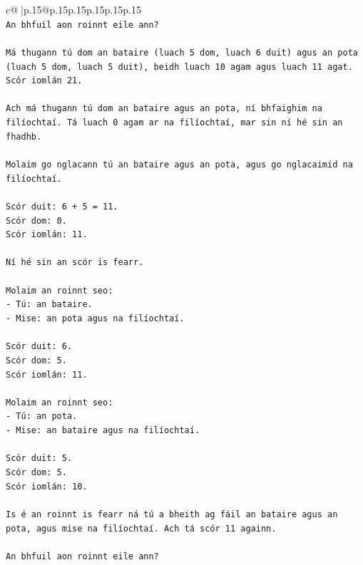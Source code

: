 \documentclass{article}
\begin{document}
{\begin{supertabular}{c@{$\;$}|p{.15\linewidth}@{}p{.15\linewidth}p{.15\linewidth}p{.15\linewidth}p{.15\linewidth}p{.15\linewidth}}
{{{\\ 
\texttt{An bhfuil aon roinnt eile ann?} \\
\\ 
\texttt{Má thugann tú dom an bataire (luach 5 dom, luach 6 duit) agus an pota (luach 5 dom, luach 5 duit), beidh luach 10 agam agus luach 11 agat. Scór iomlán 21.} \\
\\ 
\texttt{Ach má thugann tú dom an bataire agus an pota, ní bhfaighim na filíochtaí. Tá luach 0 agam ar na filíochtaí, mar sin ní hé sin an fhadhb.} \\
\\ 
\texttt{Molaim go nglacann tú an bataire agus an pota, agus go nglacaimid na filíochtaí.} \\
\\ 
\texttt{Scór duit: 6 + 5 = 11.} \\
\texttt{Scór dom: 0.} \\
\texttt{Scór iomlán: 11.} \\
\\ 
\texttt{Ní hé sin an scór is fearr.} \\
\\ 
\texttt{Molaim an roinnt seo:} \\
\texttt{{-} Tú: an bataire.} \\
\texttt{{-} Mise: an pota agus na filíochtaí.} \\
\\ 
\texttt{Scór duit: 6.} \\
\texttt{Scór dom: 5.} \\
\texttt{Scór iomlán: 11.} \\
\\ 
\texttt{Molaim an roinnt seo:} \\
\texttt{{-} Tú: an pota.} \\
\texttt{{-} Mise: an bataire agus na filíochtaí.} \\
\\ 
\texttt{Scór duit: 5.} \\
\texttt{Scór dom: 5.} \\
\texttt{Scór iomlán: 10.} \\
\\ 
\texttt{Is é an roinnt is fearr ná tú a bheith ag fáil an bataire agus an pota, agus mise na filíochtaí. Ach tá scór 11 againn.} \\
\\ 
\texttt{An bhfuil aon roinnt eile ann?} \\
\\ 
}}}
\end{supertabular}}
\end{document}
